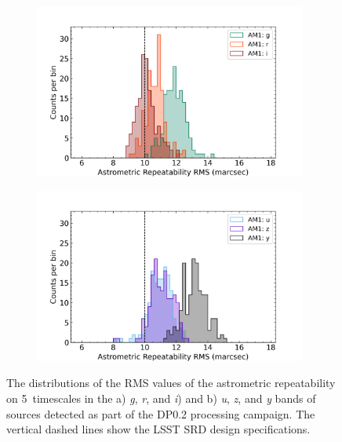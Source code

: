 \begin{figure}[!htp]
\begin{subfigure}{.5\textwidth}
    \includegraphics[width=0.98\textwidth]{figures/dp02_am1_alltracts_gri}
\end{subfigure}%
\begin{subfigure}{.5\textwidth}
    \includegraphics[width=0.98\textwidth]{figures/dp02_am1_alltracts_uzy}
\end{subfigure}
\par\medskip %
\caption[short]{The distributions of the RMS values of the astrometric repeatability on 5\arcmin\, timescales  in the a) \emph{g}, \emph{r}, and \emph{i})  and  b) \emph{u}, \emph{z}, and \emph{y} bands of sources detected as part of the DP0.2 processing campaign.
The vertical dashed lines show the LSST SRD design specifications. }
\label{fig:faro_dp02_distr_am1}
\end{figure}
